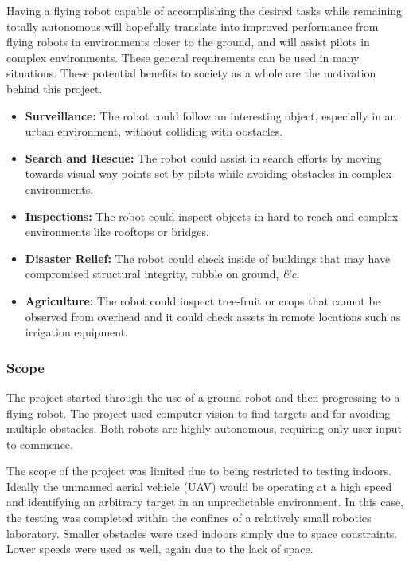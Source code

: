 \documentclass{article}[12]
\begin{document}
		Having a flying robot capable of accomplishing the desired tasks while remaining totally autonomous will hopefully translate into improved performance from flying robots in environments closer to the ground, and will assist pilots in complex environments. These general requirements can be used in many situations. These potential benefits to society as a whole are the motivation behind this project.
		
		\begin{itemize}
			\item \textbf{Surveillance:} The robot could follow an interesting object, especially in an urban environment, without colliding with obstacles.
			\item \textbf{Search and Rescue:} The robot could assist in search efforts by moving towards visual way-points set by pilots while avoiding obstacles in complex environments.
			\item \textbf{Inspections:} The robot could inspect objects in hard to reach and complex environments like rooftops or bridges.
			\item \textbf{Disaster Relief:} The robot could check inside of buildings that may have compromised structural integrity, rubble on ground, \textit{\&c}.
			\item \textbf{Agriculture:} The robot could inspect tree-fruit or crops that cannot be observed from overhead and it could check assets in remote locations such as irrigation equipment.
		\end{itemize}

		\subsubsection{Scope}
	
		The project started through the use of a ground robot and then progressing to a flying robot. The project used computer vision to find targets and for avoiding multiple obstacles. Both robots are highly autonomous, requiring only user input to commence. 

		The scope of the project was limited due to being restricted to testing indoors. Ideally the unmanned aerial vehicle (UAV) would be operating at a high speed and identifying an arbitrary target in an unpredictable environment. In this case, the testing was completed within the confines of a relatively small robotics laboratory. Smaller obstacles were used indoors simply due to space constraints. Lower speeds were used as well, again due to the lack of space. 
\end{document}
